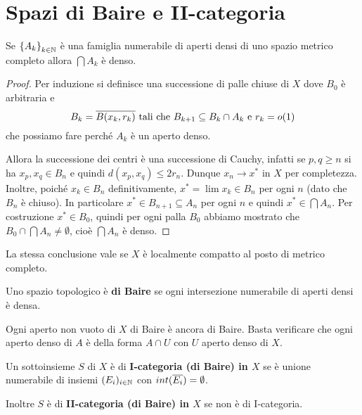 \section{Spazi di Baire e II-categoria}
\begin{theorem}[Baire]\label{ThBaire}
Se $\left\{{A_k}\right\}_{k\in\mathbb{N}}$ \`e una famiglia numerabile di aperti densi di uno spazio metrico completo allora $\bigcap A_k$ \`e denso.
\end{theorem}
\begin{proof}
Per induzione si definisce una successione di palle chiuse di $X$ dove $B_0$ \`e arbitraria e
\[B_k=\overline{B(x_k,r_k)}\text{ tali che }B_{k+1}\subseteq B_k\cap A_k\text{ e }r_k=o(1)\]
che possiamo fare perch\'e $A_k$ \`e un aperto denso.

Allora la successione dei centri \`e una successione di Cauchy, infatti se $p,q\geq n$ si ha $x_p,x_q\in B_n$ e quindi $d(x_p,x_q)\leq 2r_n$. Dunque $x_n\to x^\ast$ in $X$ per completezza. Inoltre, poich\'e $x_k\in B_n$ definitivamente, $x^\ast=\lim x_k\in B_n$ per ogni $n$ (dato che $B_n$ \`e chiuso). In particolare $x^\ast\in B_{n+1}\subseteq A_n$ per ogni $n$ e quindi $x^\ast\in \bigcap A_n$. Per costruzione $x^\ast\in B_0$, quindi per ogni palla $B_0$ abbiamo mostrato che $B_0\cap \bigcap A_n\neq \emptyset$, cio\`e $\bigcap A_n$ \`e denso.
\end{proof}

\begin{exercise}
La stessa conclusione vale se $X$ \`e localmente compatto al posto di metrico completo.
\end{exercise}

\begin{definition}
Uno spazio topologico \`e \textbf{di Baire} se ogni intersezione numerabile di aperti densi \`e densa.
\end{definition}

\begin{remark}
Ogni aperto non vuoto di $X$ di Baire \`e ancora di Baire. Basta verificare che ogni aperto denso di $A$ \`e della forma $A\cap U$ con $U$ aperto denso di $X$.
\end{remark}


\begin{definition}
Un sottoinsieme $S$ di $X$ \`e di \textbf{I-categoria (di Baire) in $X$} se \`e unione numerabile di insiemi $(E_i)_{i\in\mathbb{N}}$ con $int(\overline{E_i})=\emptyset$.

Inoltre $S$ \`e di \textbf{II-categoria (di Baire) in $X$} se non \`e di I-categoria.
\end{definition}

